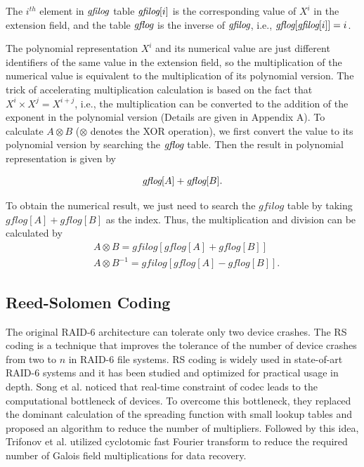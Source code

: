 \documentclass[journal]{IEEEtran}
\begin{document}
The $i^{th}$ element in $\emph{gfilog}$ table $\emph{gfilog}[i]$ is the corresponding value of $X^i$ in the extension field, and the table $\emph{gflog}$ is the inverse of $\emph{gfilog}$, i.e., $\emph{gflog}[\emph{gfilog}[i]]=i$. 

The polynomial representation $X^i$ and its numerical value are just different identifiers of the same value in the extension field, so the multiplication of the numerical value is equivalent to the multiplication of its polynomial version. The trick of accelerating multiplication calculation is based on the fact that $X^i\times X^j=X^{i+j}$, i.e., the multiplication can be converted to the addition of the exponent in the polynomial version (Details are given in Appendix A). To calculate $A\otimes B$ ($\otimes$ denotes the XOR operation), we first convert the value to its polynomial version by searching the $\emph{gflog}$ table. Then the result in polynomial representation is given by

\begin{align}
    \emph{gflog} [A]+\emph{gflog} [B].
\end{align}

To obtain the numerical result, we just need to search the $gfilog$ table by taking $gflog[A]+gflog[B]$ as the index.
Thus, the multiplication and division can be calculated by
\begin{align}
  & A\otimes B=gfilog [gflog [A]+gflog [B]] \\ 
 & A\otimes {{B}^{-1}}=gfilog [gflog [A]-gflog [B]].
\end{align}


\subsection{Reed-Solomen Coding}
The original RAID-6 architecture can tolerate only two device crashes. The RS coding is a technique that improves the tolerance of the number of device crashes from two to $n$ in RAID-6 file systems. RS coding is widely used in state-of-art RAID-6 systems and it has been studied and optimized for practical usage in depth. Song et al. \cite{2007RS_1} noticed that real-time constraint of
codec leads to the computational bottleneck of devices. To overcome this bottleneck, they replaced the dominant calculation of the spreading function with small lookup tables and proposed an algorithm to reduce the number of multipliers. Followed by this idea, Trifonov et al. \cite{2015RS_2} utilized cyclotomic fast Fourier transform to reduce the required number of Galois field multiplications for data recovery. 
\end{document}
